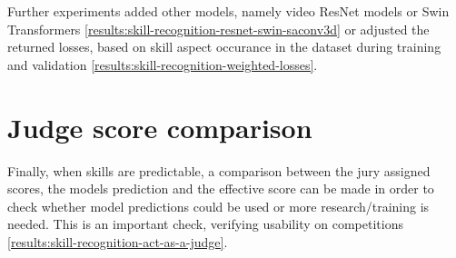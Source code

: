 Further experiments added other models, namely video ResNet models or Swin Transformers \ref{results:skill-recognition-resnet-swin-saconv3d} or adjusted the returned losses, based on skill aspect occurance in the dataset during training and validation \ref{results:skill-recognition-weighted-losses}. 

\section{Judge score comparison}
\label{methodology:judge-score-comparison}

Finally, when skills are predictable, a comparison between the jury assigned scores, the models prediction and the effective score can be made in order to check whether model predictions could be used or more research/training is needed. This is an important check, verifying usability on competitions \ref{results:skill-recognition-act-as-a-judge}.

